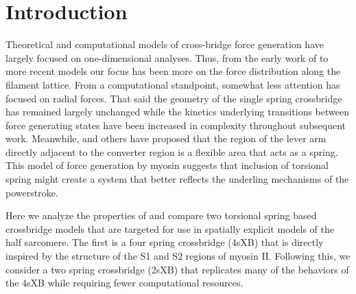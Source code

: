\documentclass[]{article}
\begin{document}
\section{Introduction} %



Theoretical and computational models of cross-bridge force generation have largely focused on one-dimensional analyses. 
Thus, from the early work of \citet{Huxley1957} to more recent models \citep{Daniel1998, Chase:2004:p204, Tanner:2007:pe115} our focus has been more on the force distribution along the filament lattice.  
From a computational standpoint, somewhat less attention has focused on radial forces. 
That said the geometry of the single spring crossbridge has remained largely unchanged while the kinetics underlying transitions between force generating states have been increased in complexity throughout subsequent work. \citep{Pate1989, Daniel1998, Tanner:2007:pe115}
Meanwhile, \citet{Houdusse:2001:p182} and others have proposed that the region of the lever arm directly adjacent to the converter region is a flexible area that acts as a spring. 
This model of force generation by myosin suggests that inclusion of torsional spring might create a system that better reflects the underling mechanisms of the powerstroke. 

Here we analyze the properties of and compare two torsional spring based crossbridge models that are targeted for use in spatially explicit models of the half sarcomere. 
The first is a four spring crossbridge (4sXB) that is directly inspired by the structure of the S1 and S2 regions of myosin II. 
Following this, we consider a two spring crossbridge (2sXB) that replicates many of the behaviors of the 4sXB while requiring fewer computational resources.
\end{document}

